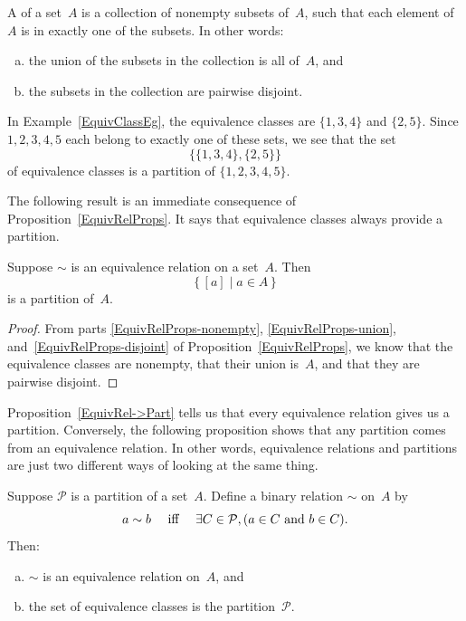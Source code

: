 \begin{defn}
A  of a set~$A$ is a collection of nonempty subsets of~$A$, such that each element of~$A$ is in exactly one of the subsets. In other words:
\begin{enumerate}[(a)]
\item the union of the subsets in the collection is all of~$A$,
and
\item the subsets in the collection are pairwise disjoint.
\end{enumerate}
\end{defn}


\begin{eg} \label{EquivClassPartEg}
In Example~\ref{EquivClassEg}, the equivalence classes are $\{1,3,4\}$ and $\{2,5\}$. Since $1,2,3,4,5$ each belong to exactly one of these sets, we see that the set
	$$ \bigl\{ \{1,3,4\}, \{2,5\} \bigr\} $$
of equivalence classes is a partition of $\{1,2, 3,4,5\}$.
\end{eg}


The following result is an immediate consequence of Proposition~\ref{EquivRelProps}. It says that equivalence classes always provide a partition.

\begin{thm} \label{EquivRel->Part}
Suppose $\sim$ is an equivalence relation on a set~$A$. Then 
	$$ \{\, [a] \mid a \in A \,\} $$
is a partition of~$A$.
\end{thm}

\begin{proof}
From parts \ref{EquivRelProps-nonempty}, \ref{EquivRelProps-union}, and~\ref{EquivRelProps-disjoint} of Proposition~\ref{EquivRelProps}, we know that the equivalence classes are nonempty, that their union is~$A$, and that they are pairwise disjoint.
\end{proof}

Proposition~\ref{EquivRel->Part} tells us that every equivalence relation gives us a partition. Conversely, the following proposition shows that any partition comes from an equivalence relation. In other words, equivalence relations and partitions are just two different ways of looking at the same thing.

\begin{prop}{}\label{Part->EquivRel}
Suppose $\mathcal{P}$ is a partition of a set~$A$. Define a binary relation $\sim$ on~$A$ by
	$$ \text{$a \sim b$ \quad iff \quad $\exists C \in \mathcal{P}, ( \text{$a \in C$ and $b \in C$} )$} .$$
Then:
\begin{enumerate}[(a)]
\item \label{Part->EquivRel-equiv}
 $\sim$ is an equivalence relation on~$A$,
and
\item \label{Part->EquivRel-classes}
 the set of equivalence classes is the partition~$\mathcal{P}$.
\end{enumerate}
\end{prop}



